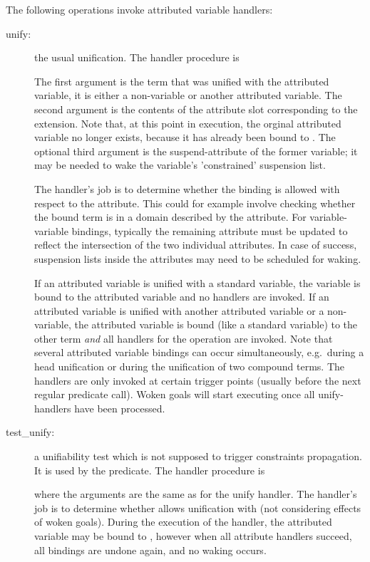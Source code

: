 The following operations invoke attributed variable handlers:

\begin{description}
\item [unify:]
  the usual unification.
The handler procedure is
\begin{quote}
\end{quote}
The first argument is the term that was unified with the attributed variable,
it is either a non-variable or another attributed variable.
The second argument is the contents of the attribute slot
corresponding to the extension.  Note that, at this point in execution,
the orginal attributed variable no longer exists, because it has already
been bound to .
The optional third argument is the suspend-attribute of the former
variable; it may be needed to wake the variable's 'constrained' suspension
list.

The handler's job is to determine whether the binding is allowed with
respect to the attribute.  This could for example involve checking whether
the bound term is in a domain described by the attribute.
For variable-variable bindings, typically the remaining attribute must
be updated to reflect the intersection of the two individual attributes.
In case of success, suspension lists inside the attributes may need to
be scheduled for waking.

If an attributed variable is unified with a standard variable, the variable is
bound
to the attributed variable and no handlers are invoked.
If an attributed variable is unified with another attributed variable or a
non-variable,
the attributed variable is bound (like a standard variable) to the other term
\emph{and} all handlers for the  operation are invoked.
Note that several attributed variable bindings can occur simultaneously,
e.g.\ during a head unification or
during the unification of two compound terms.
The handlers are only invoked at certain trigger points (usually before the
next regular predicate call).  Woken goals will start executing once all
unify-handlers have been processed.

\item [test_unify:]
  a unifiability test which is not supposed
to trigger constraints propagation. It is used
by the 
predicate.
The handler procedure is
\begin{quote}
\end{quote}
where the arguments are the same as for the unify handler.
The handler's job is to determine whether  allows
unification with  (not considering effects of woken goals).
During the execution of the handler, the attributed variable may be bound
to , however when all attribute handlers succeed,
all bindings are undone again, and no waking occurs.


\end{description}
